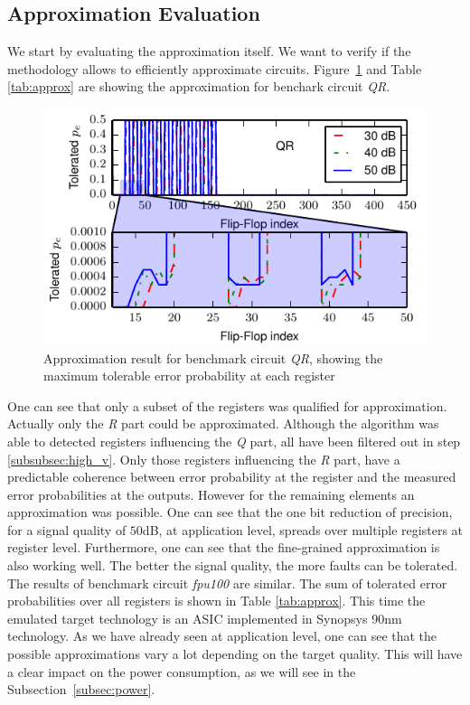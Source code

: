 \documentclass[conference]{IEEEtran}
\begin{document}
\subsection{Approximation Evaluation}
We start by evaluating the approximation itself. We want to verify if the methodology allows to efficiently approximate circuits.
Figure~\ref{fig:optimization_qr} and Table \ref{tab:approx} are showing the approximation for benchark circuit \emph{QR}. 
\begin{figure}[htb]
  \centering
  \includegraphics[width=.5\textwidth]{figs/optimization_qr}
  \caption{Approximation result for benchmark circuit \emph{QR}, showing the maximum tolerable error probability at each register}
  \label{fig:optimization_qr}
\end{figure}
One can see that only a subset of the registers was qualified for approximation. Actually only the \emph{R} part could be approximated. Although the algorithm was able to detected registers influencing the \emph{Q} part, all have been filtered out in step \ref{subsubsec:high_v}. Only those registers influencing the \emph{R} part, have a predictable coherence between error probability at the register and the measured error probabilities at the outputs. However for the remaining elements an approximation was possible. One can see that the one bit reduction of precision, for a signal quality of $50$dB, at application level, spreads over multiple registers at register level. Furthermore, one can see that the fine-grained approximation is also working well. The better the signal quality, the more faults can be tolerated.
The results of benchmark circuit \emph{fpu100} are similar. The sum of tolerated error probabilities over all registers is shown in Table \ref{tab:approx}. This time the emulated target technology is an ASIC implemented in Synopsys 90nm technology. As we have already seen at application level, one can see that the possible approximations vary a lot depending on the target quality. This will have a clear impact on the power consumption, as we will see in the Subsection~\ref{subsec:power}.
\end{document}
